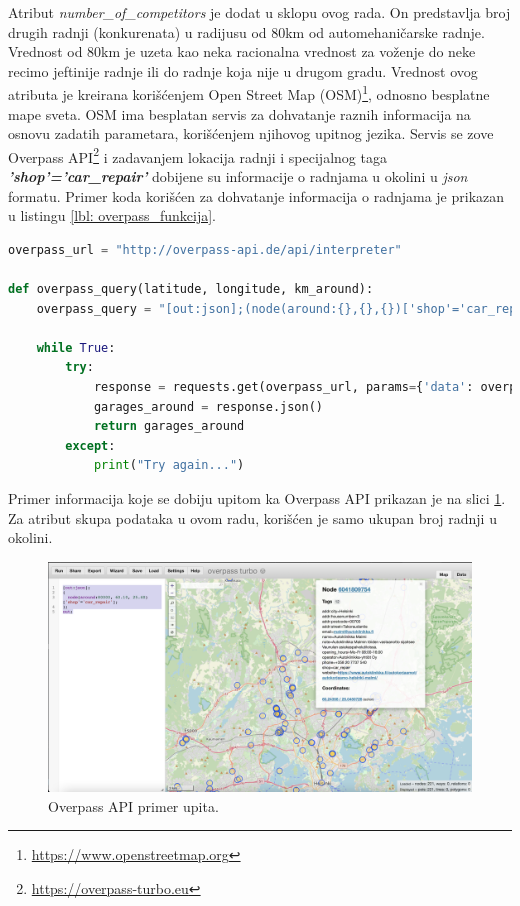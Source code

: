 \documentclass[12pt,oneside]{memoir}
\begin{document}
Atribut \textit{number\_of\_competitors} je dodat u sklopu ovog rada. On predstavlja broj drugih radnji (konkurenata) u radijusu od 80km od automehaničarske radnje. Vrednost od 80km je uzeta kao neka racionalna vrednost za voženje do neke recimo jeftinije radnje ili do radnje koja nije u drugom gradu. Vrednost ovog atributa je kreirana korišćenjem Open Street Map (OSM)\footnote{\url{https://www.openstreetmap.org}}, odnosno besplatne mape sveta. OSM ima besplatan servis za dohvatanje raznih informacija na osnovu zadatih parametara, korišćenjem njihovog upitnog jezika. Servis se zove Overpass API\footnote{\url{https://overpass-turbo.eu}} i zadavanjem lokacija radnji i specijalnog taga \textbf{\textit{'shop'='car\_repair'}} dobijene su informacije o radnjama u okolini u \textit{json} formatu. Primer koda korišćen za dohvatanje informacija o radnjama je prikazan u listingu \ref{lbl: overpass_funkcija}.\\
\begin{lstlisting}[language=python, belowskip=-\baselineskip, frame=single, label=lbl: overpass_funkcija, caption={Funkcija za dohvatanje informacija o drugim radnjama u okolini.}]
overpass_url = "http://overpass-api.de/api/interpreter"

def overpass_query(latitude, longitude, km_around):
    overpass_query = "[out:json];(node(around:{},{},{})['shop'='car_repair'];);out;".format(km_around, latitude, longitude)

    while True:
        try:
            response = requests.get(overpass_url, params={'data': overpass_query})
            garages_around = response.json()
            return garages_around
        except:
            print("Try again...")
\end{lstlisting} 
\vspace{20pt}
Primer informacija koje se dobiju upitom ka Overpass API prikazan je na slici \ref{fig: overpass}. Za atribut skupa podataka u ovom radu, korišćen je samo ukupan broj radnji u okolini. 

\begin{figure}[!ht]
  \centering
  \includegraphics[width=1\textwidth]{./grafici/overpass_primer.png}
  \caption{Overpass API primer upita.}
  \label{fig: overpass}
\end{figure}
\end{document}
